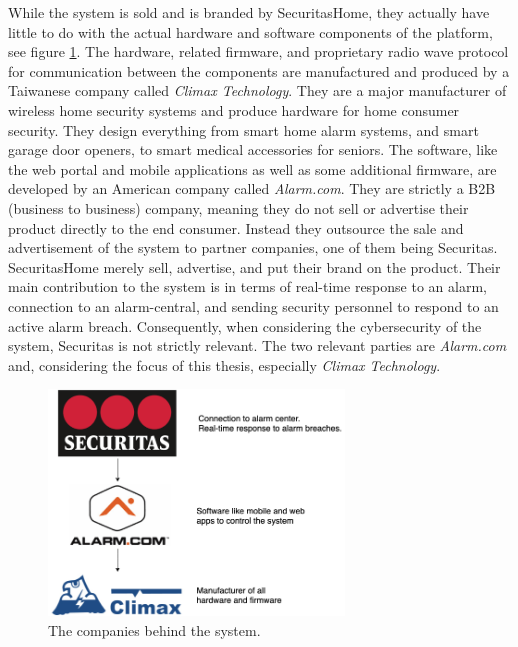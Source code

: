 While the system is sold and is branded by SecuritasHome, they actually have little to do with the actual hardware and software components of the platform, see figure \ref{fig:company-structure}. The hardware, related firmware, and proprietary radio wave protocol for communication between the components are manufactured and produced by a Taiwanese company called \textit{Climax Technology}. They are a major manufacturer of wireless home security systems and produce hardware for home consumer security. They design everything from smart home alarm systems, and smart garage door openers, to smart medical accessories for seniors. The software, like the web portal and mobile applications as well as some additional firmware, are developed by an American company called \textit{Alarm.com}. They are strictly a B2B (business to business) company, meaning they do not sell or advertise their product directly to the end consumer. Instead they outsource the sale and advertisement of the system to partner companies, one of them being Securitas. SecuritasHome merely sell, advertise, and put their brand on the product. Their main contribution to the system is in terms of real-time response to an alarm, connection to an alarm-central, and sending security personnel to respond to an active alarm breach. Consequently, when considering the cybersecurity of the system, Securitas is not strictly relevant. The two relevant parties are \textit{Alarm.com} and, considering the focus of this thesis, especially \textit{Climax Technology}.
\begin{figure}[!ht]
    \centering
    \includegraphics[width=0.7\textwidth]{images/company-structure.png}
    \caption{The companies behind the system.}
    \label{fig:company-structure}
\end{figure}

